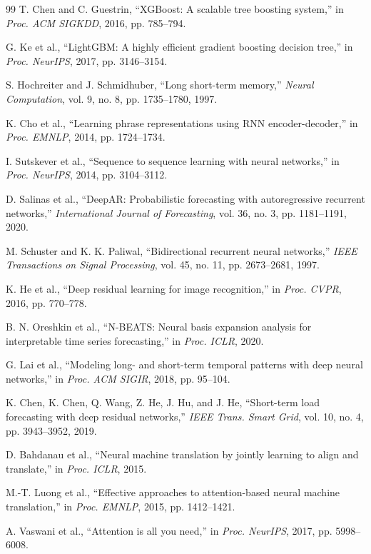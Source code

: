 \documentclass{ieeeaccess}
\begin{document}
\begin{thebibliography}{99}
T. Chen and C. Guestrin, ``XGBoost: A scalable tree boosting system,'' in \emph{Proc. ACM SIGKDD}, 2016, pp. 785--794.

G. Ke et al., ``LightGBM: A highly efficient gradient boosting decision tree,'' in \emph{Proc. NeurIPS}, 2017, pp. 3146--3154.

S. Hochreiter and J. Schmidhuber, ``Long short-term memory,'' \emph{Neural Computation}, vol. 9, no. 8, pp. 1735--1780, 1997.

K. Cho et al., ``Learning phrase representations using RNN encoder-decoder,'' in \emph{Proc. EMNLP}, 2014, pp. 1724--1734.

I. Sutskever et al., ``Sequence to sequence learning with neural networks,'' in \emph{Proc. NeurIPS}, 2014, pp. 3104--3112.

D. Salinas et al., ``DeepAR: Probabilistic forecasting with autoregressive recurrent networks,'' \emph{International Journal of Forecasting}, vol. 36, no. 3, pp. 1181--1191, 2020.

M. Schuster and K. K. Paliwal, ``Bidirectional recurrent neural networks,'' \emph{IEEE Transactions on Signal Processing}, vol. 45, no. 11, pp. 2673--2681, 1997.

K. He et al., ``Deep residual learning for image recognition,'' in \emph{Proc. CVPR}, 2016, pp. 770--778.

B. N. Oreshkin et al., ``N-BEATS: Neural basis expansion analysis for interpretable time series forecasting,'' in \emph{Proc. ICLR}, 2020.

G. Lai et al., ``Modeling long- and short-term temporal patterns with deep neural networks,'' in \emph{Proc. ACM SIGIR}, 2018, pp. 95--104.

K. Chen, K. Chen, Q. Wang, Z. He, J. Hu, and J. He, ``Short-term load forecasting with deep residual networks,'' \emph{IEEE Trans. Smart Grid}, vol. 10, no. 4, pp. 3943--3952, 2019.

D. Bahdanau et al., ``Neural machine translation by jointly learning to align and translate,'' in \emph{Proc. ICLR}, 2015.

M.-T. Luong et al., ``Effective approaches to attention-based neural machine translation,'' in \emph{Proc. EMNLP}, 2015, pp. 1412--1421.

A. Vaswani et al., ``Attention is all you need,'' in \emph{Proc. NeurIPS}, 2017, pp. 5998--6008.


\end{thebibliography}
\end{document}
